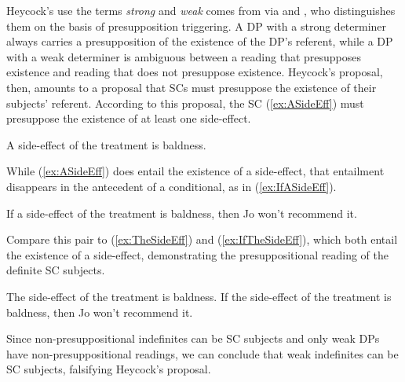 \documentclass[
	letterpaper,
]{article}
\begin{document}
Heycock's use the terms \textit{strong} and \textit{weak} comes from \textcite{milsark1974existential} via \textcite{dehoop1992case} and \textcite{diesing1992indefinites}, who distinguishes them on the basis of presupposition triggering.
A DP with a strong determiner always carries a presupposition of the existence of the DP's referent, while a DP with a weak determiner is ambiguous between a reading that presupposes existence and reading that does not presuppose existence.
Heycock's proposal, then, amounts to a proposal that SCs must presuppose the existence of their subjects' referent.
According to this proposal, the SC (\ref{ex:ASideEff}) must presuppose the existence of at least one side-effect.
\begin{exe}
	\ex\label{ex:ASideEff} A side-effect of the treatment is baldness.
\end{exe}
While (\ref{ex:ASideEff}) does entail the existence of a side-effect, that entailment disappears in the antecedent of a conditional, as in (\ref{ex:IfASideEff}).
\begin{exe}
	\ex\label{ex:IfASideEff} If a side-effect of the treatment is baldness, then Jo won't recommend it.
\end{exe}
Compare this pair to (\ref{ex:TheSideEff}) and (\ref{ex:IfTheSideEff}), which both entail the existence of a side-effect, demonstrating the presuppositional reading of the definite SC subjects.
\begin{exe}
	\ex\label{ex:TheSideEff} The side-effect of the treatment is baldness.
	\ex\label{ex:IfTheSideEff} If the side-effect of the treatment is baldness, then Jo won't recommend it.
\end{exe}
Since non-presuppositional indefinites can be SC subjects and only weak DPs have non-presuppositional readings, we can conclude that weak indefinites can be SC subjects, falsifying Heycock's proposal.
\end{document}

